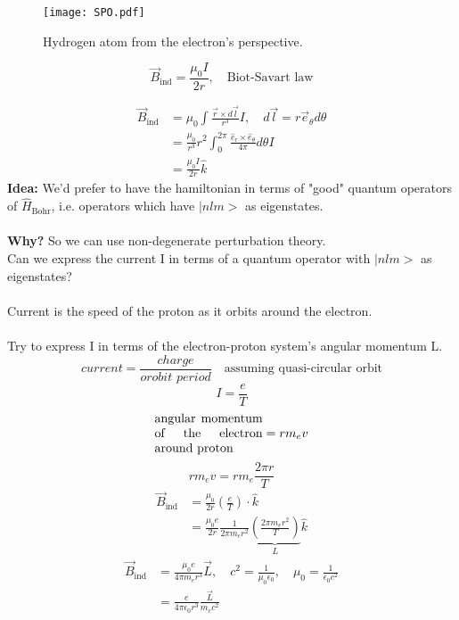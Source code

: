 \documentclass[12pt,fancychapters]{report}
\numberwithin{equation}{section}
\begin{document}
\begin{wrapfigure}[4]{l}{7cm}
  \begin{center}
\texttt{[image: SPO.pdf]}
\caption{Hydrogen atom from the electron's perspective.}
  \end{center}
\end{wrapfigure}

\[
  \vec{B}_\text{ind} = \frac{\mu_0 I}{2r}, \quad \text{Biot-Savart law}
\]

\begin{align*}
  \vec{B}_\text{ind} &= \mu_0\int \frac{\vec{r}\times 
  d\vec{l}}{r^3}I, \quad d\vec{l}  = r\vec{e}_\theta d\theta\\
 &= \frac{\mu_0}{r^3}r^2\int_{0}^{2\pi} \frac{\hat{e}_r \times 
\hat{e}_\theta}{4\pi}d\theta I\\
 &= \frac{\mu_0 I}{2r}\hat{k}
\end{align*}
\textbf{Idea:} We'd prefer to have the hamiltonian in terms of "good" quantum operators of 
$\hat{H}_\text{Bohr}$, i.e. operators which have $\big|nlm\big>$ as eigenstates.\\
\\
\textbf{Why?} So we can use non-degenerate perturbation theory.\\
Can we express the current I in terms of a quantum operator with $\big|nlm\big>$ as 
eigenstates?\\
\\
Current is the speed of the proton as it orbits around the electron.\\
\\
Try to express I in terms of the electron-proton system's angular momentum L.
\[
  current = \frac{charge}{orobit\,\,period}\quad \text{assuming quasi-circular orbit}
\]
\[
  I = \frac{e}{T}
\]
\[
  \parbox{0.25\textwidth}{angular momentum of the electron around proton}  =
  r m_e v
\]
\[
  r m_e v = r m_e \frac{2\pi r}{T}
\]
\begin{align*}
  \vec{B}_\text{ind} &= \frac{\mu_0}{2r}\left(\frac{e}{T}\right)\cdot\hat{k}\\
&= \frac{\mu_0 e}{2r} \frac{1}{2\pi m_e r^2}\underbrace{\left(\frac{2\pi m_e r^2}{T}\right)}
_{L}\hat{k}
\end{align*}
\begin{align*}
  \vec{B}_\text{ind} &= \frac{\mu_0 e}{4\pi m_e r^3}\vec{L}, \quad c^2 = 
  \frac{1}{\mu_0 \epsilon_0}, \quad \mu_0 = \frac{1}{\epsilon_0 c^2}\\
                     &= \frac{e}{4\pi \epsilon_0 r^3}\frac{\vec{L}}{m_e c^2} 
\end{align*}
\end{document}
